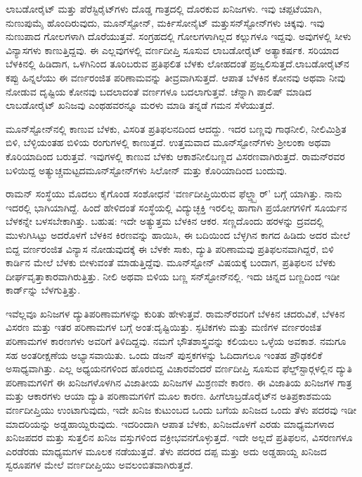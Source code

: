 ಲಾಬಡೋರೈಟ್ ಮತ್ತು ಪೆರೆಸ್ಟಿರೈಟ್‍ಗಳು ದೊಡ್ಡ ಗಾತ್ರದಲ್ಲಿ ದೊರಕುವ ಖನಿಜಗಳು. ಇವು ಚಪ್ಪಟೆಯಾಗಿ, ನುಣುಪುಮೈ ಹೊಂದಿರುವುದು, ಮೂನ್‍ಸ್ಟೋನ್, ಮರ್ಕಿಸೋನೈಟ್ ಮತ್ತು\break ಸನ್‍ಸ್ಟೋನ್‍ಗಳು ಚಿಕ್ಕವು. ಇವು ನುಣುಪಾದ ಗೋಲಗಳಾಗಿ ದೊರೆಯುತ್ತವೆ. ಸಂಗ್ರಹದಲ್ಲಿ ಗೋಲಗಳಾಗಿಲ್ಲದ ಕಲ್ಲುಗಳೂ ಇದ್ದವು. ಅವುಗಳಲ್ಲಿ ಸೀಳು ವಿನ್ಯಾಸಗಳು ಕಾಣುತ್ತಿದ್ದವು. ಈ ಎಲ್ಲವುಗಳಲ್ಲಿ ವರ್ಣದೀಪ್ತಿ ಸೂಸುವ ಲಾಬಡೋರೈಟ್ ಅತ್ಯಾಕರ್ಷಕ. ಸರಿಯಾದ ಬೆಳಕಿನಲ್ಲಿ ಹಿಡಿದಾಗ, ಒಳಗಿನಿಂದ ತೂರಿಬರುವ ಪ್ರತಿಫಲಿತ ಬೆಳಕು ಲೋಹದಂತೆ ಪ್ರಜ್ವಲಿಸುತ್ತದೆ.\break ಲಾಬಡೋರೈಟ್‍ನ ಕಪ್ಪು ಹಿನ್ನಲೆಯು ಈ ವರ್ಣರಂಜಿತ ಪರಿಣಾಮವನ್ನು ತೀವ್ರವಾಗಿಸುತ್ತದೆ. ಆಪಾತ ಬೆಳಕಿನ ಕೋನವು ಅಥವಾ ನೀವು ನೋಡುವ ದೃಷ್ಟಿಯ ಕೋನವು ಬದಲಾದಂತೆ ವರ್ಣಗಳೂ ಬದಲಾಗುತ್ತವೆ. ಚೆನ್ನಾಗಿ ಪಾಲಿಷ್ ಮಾಡಿದ ಲಾಬಡೋರೈಟ್ ಖನಿಜವು ಎಂಥಹವರನ್ನೂ ಮರಳು ಮಾಡಿ ತನ್ನಡೆ ಗಮನ ಸೆಳೆಯುತ್ತದೆ.

ಮೂನ್‍ಸ್ಟೋನ್‍ನಲ್ಲಿ ಕಾಣುವ ಬೆಳಕು, ವಿಸರಿತ ಪ್ರತಿಫಲನದಿಂದ ಆದದ್ದು. ಇದರ ಬಣ್ಣವು ಗಾಢನೀಲಿ, ನೀಲಿಮಿಶ್ರಿತ ಬಿಳಿ, ಬೆಳ್ಳಿಯಂತಹ ಬಿಳಿಯ ರಂಗುಗಳಲ್ಲಿ ಕಾಣುತ್ತದೆ. ಉತ್ತಮವಾದ ಮೂನ್‍ಸ್ಟೋನ್‍ಗಳು ಶ‍್ರೀಲಂಕಾ ಅಥವಾ ಕೊರಿಯಾದಿಂದ ಬರುತ್ತವೆ. ಇವುಗಳಲ್ಲಿ ಕಾಣುವ ಬೆಳಕು ಆಕಾಶನೀಲಿಬಣ್ಣದ ವಿಸರಣವಾಗಿರುತ್ತದೆ. ರಾಮನ್‍ರವರ ಬಳಿಯಿದ್ದ ಅತ್ಯುಚ್ಚಮಟ್ಟದ\break ಮೂನ್‍ಸ್ಟೋನ್‍ಗಳು ಸಿಲೋನ್ ಮತ್ತು ಕೊರಿಯಾದಿಂದ ಬಂದುವು.

ರಾಮನ್ ಸಂಸ್ಥೆಯು ಮೊದಲು ಕೈಗೊಂಡ ಸಂಶೋಧನೆ ‘ವರ್ಣದೀಪ್ತಿಯಿರುವ ಫೆಲ್ಡ್ಸ್ಪಾರ್’ ಬಗ್ಗೆ ಯಾಗಿತ್ತು. ನಾನು ಇದರಲ್ಲಿ ಭಾಗಿಯಾಗಿದ್ದೆ. ಹಿಂದೆ ಹೇಳಿದಂತೆ ಸಂಸ್ಥೆಯಲ್ಲಿ ವಿದ್ಯುಚ್ಛಕ್ತಿ ಇರಲಿಲ್ಲ ಹಾಗಾಗಿ ಪ್ರಯೋಗಗಳಿಗೆ ಸೂರ್ಯನ ಬೆಳಕನ್ನೇ ಬಳಸಬೇಕಾಗಿತ್ತು. ಬಹುಷ: ಇದೇ ಅತ್ಯುತ್ತಮ ಬೆಳಕಿನ ಆಕರ. ಸಣ್ಣದೊಂದು ಹರಳನ್ನು ದ್ರವದಲ್ಲಿ ಮುಳುಗಿಸಿಟ್ಟು ಅದರೊಳಗೆ ಬೆಳಕಿನ ಕಿರಣವನ್ನು ಹಾಯಿಸಿ, ಈ ಬದಿಯಿಂದ ಬೆಳ್ಳಗಿನ ಕಾಗದ ಹಿಡಿದು ಅದರ ಮೇಲೆ ಬಿದ್ದ ವರ್ಣರಂಜಿತ ವಿನ್ಯಾಸ ನೋಡುವುದಕ್ಕೆ ಈ ಬೆಳಕೇ ಸಾಕು, ದ್ಯುತಿ ಪರಿಣಾಮವು ಪ್ರತಿಫಲನವಾಗಿದ್ದರೆ, ಬಿಳಿ ಕಾರ್ಡಿನ ಮೇಲೆ ಬೆಳಕು ಬೀಳುವಂತೆ ಮಾಡುತ್ತಿದ್ದೆವು. ಮೂನ್‍ಸ್ಟೋನ್ ವಿಷಯಕ್ಕೆ ಬಂದಾಗ, ಪ್ರತಿಫಲನ ಬೆಳಕು ದೀರ್ಘವೃತ್ತಾಕಾರವಾಗಿರುತ್ತಿತ್ತು. ನೀಲಿ ಅಥವಾ ಬಿಳಿಯ ಬಣ್ಣ ಸನ್‍ಸ್ಟೋನ್‍ನಲ್ಲಿ. ಇದು ಚಿನ್ನದ ಬಣ್ಣದಿಂದ ಇಡೀ ಕಾರ್ಡ್‌ನ್ನು ಬೆಳಗುತ್ತಿತ್ತು.

ಇವೆಲ್ಲವೂ ಖನಿಜಗಳ ದ್ಯುತಿಪರಿಣಾಮಗಳನ್ನು ಕುರಿತು ಹೇಳುತ್ತವೆ. ರಾಮನ್‍ರವರಿಗೆ ಬೆಳಕಿನ ಚದರುವಿಕೆ, ಬೆಳಕಿನ ವಿಸರಣ ಮತ್ತು ಇತರ ಪರಿಣಾಮಗಳ ಬಗ್ಗೆ ಅಂತ:ದೃಷ್ಟಿಯಿತ್ತು. ಸ್ಫಟಿಕಗಳು ಮತ್ತು ಮಣಿಗಳ ವರ್ಣರಂಜಿತ ಪರಿಣಾಮಗಳ ಕಾರಣಗಳು ಅವರಿಗೆ ತಿಳಿದಿದ್ದವು. ನಮಗೆ ಭೌತಶಾಸ್ತ್ರವನ್ನು ಕಲಿಯಲು ಒಳ್ಳೆಯ ಅವಕಾಶ. ನಮಗೂ ಸಹ ಅಂತರೀಕ್ಷಣೆಯ ಅಭ್ಯಾಸವಾಯಿತು. ಒಂದು ಡಜನ್ ಪುಸ್ತಕಗಳನ್ನು ಓದಿದಾಗಲೂ ಇಂತಹ ಪ್ರೌಢಕಲಿಕೆ ಅಸಾಧ್ಯವಾಗಿತ್ತು. ಎಲ್ಲ ಅಧ್ಯಯನಗಳಿಂದ ಹೊರಬಿದ್ದ ವಿಚಾರವೆಂದರೆ ವರ್ಣದೀಪ್ತಿ ಸೂಸುವ ಫೆಲ್ಡ್‌ಸ್ಟಾರ್‍ಗಳಲ್ಲಿನ ದ್ಯುತಿ ಪರಿಣಾಮಗಳಿಗೆ ಈ ಖನಿಜಗಳೊಳಗಿನ ವಿಜಾತೀಯ ಖನಿಜಗಳ ಮಿಶ್ರಣವೇ ಕಾರಣ. ಈ ವಿಜಾತಿಯ ಖನಿಜಗಳ ಗಾತ್ರ ಮತ್ತು ಆಕಾರಗಳು ಆಯಾ ದ್ಯುತಿ ಪರಿಣಾಮಗಳಿಗೆ ಮೂಲ ಕಾರಣ. ಹೀಗೆ\break ಲಾಬ್ರಡೊರೈಟ್‍ನ ಅತಿಪ್ರಕಾಶಮಯ ವರ್ಣದೀಪ್ತಿಯು ಉಂಟಾಗುವುದು, ಇದೇ ಖನಿಜ ಕುಟುಂಬದ ಒಂದು ಬಗೆಯ ಖನಿಜದ ಒಂದು ತೆಳು ಪದರವು ಇಡೀ ಮಾದರಿಯನ್ನು ಅಡ್ಡಹಾಯ್ದಿರುವುದು. ಇದರಿಂದಾಗಿ ಆಪಾತ ಬೆಳಕು, ಖನಿಜದೊಳಗೆ ಎರಡು ಮಾಧ್ಯಮಗಳಾದ ಖನಿಜಪದರ ಮತ್ತು ಸುತ್ತಲಿನ ಖನಿಜ ವಸ್ತುಗಳಿಂದ ವಕ್ರೀಭವನಗೊಳ್ಳುತ್ತದೆ. ಇದೇ ಅಲ್ಲದೆ ಪ್ರತಿಫಲನ, ವಿಸರಣಗಳೂ ಎರಡೆರಡು ಮಾಧ್ಯಮಗಳ ಮೂಲಕ ನಡೆಯುತ್ತವೆ. ತೆಳು ಪದರದ ದಪ್ಪ ಮತ್ತು ಅದು ಅಡ್ಡಹಾಯ್ದ ಖನಿಜದ ಸ್ವರೂಪಗಳ ಮೇಲೆ ವರ್ಣದೀಪ್ತಿಯು ಅವಲಂಬಿತವಾಗಿರುತ್ತದೆ.

